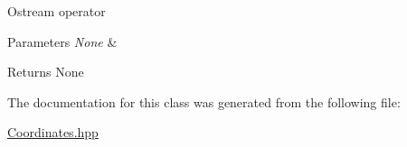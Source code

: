 Ostream operator


\begin{DoxyParams}{Parameters}
{\em None} & \\
\hline
\end{DoxyParams}
\begin{DoxyReturn}{Returns}
None 
\end{DoxyReturn}


The documentation for this class was generated from the following file\+:\begin{DoxyCompactItemize}
\item 
\mbox{\hyperlink{_coordinates_8hpp}{Coordinates.\+hpp}}\end{DoxyCompactItemize}
